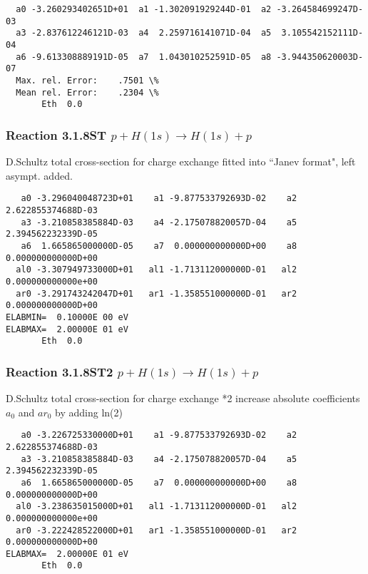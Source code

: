 \documentclass[12pt,dvipdfmx]{article}
\begin{document}
\begin{small}\begin{verbatim}
  a0 -3.260293402651D+01  a1 -1.302091929244D-01  a2 -3.264584699247D-03
  a3 -2.837612246121D-03  a4  2.259716141071D-04  a5  3.105542152111D-04
  a6 -9.613308889191D-05  a7  1.043010252591D-05  a8 -3.944350620003D-07
  Max. rel. Error:    .7501 \%
  Mean rel. Error:    .2304 \%
       Eth  0.0
\end{verbatim}\end{small}

\subsubsection{
Reaction 3.1.8ST $  p + H(1s) \rightarrow H(1s) + p  $
}
D.Schultz total cross-section for charge exchange
fitted into ``Janev format", left asympt. added.


\begin{small}\begin{verbatim}
   a0 -3.296040048723D+01    a1 -9.877533792693D-02    a2  2.622855374688D-03
   a3 -3.210858385884D-03    a4 -2.175078820057D-04    a5  2.394562232339D-05
   a6  1.665865000000D-05    a7  0.000000000000D+00    a8  0.000000000000D+00
  al0 -3.307949733000D+01   al1 -1.713112000000D-01   al2  0.000000000000e+00
  ar0 -3.291743242047D+01   ar1 -1.358551000000D-01   ar2  0.000000000000D+00
ELABMIN=  0.10000E 00 eV
ELABMAX=  2.00000E 01 eV
       Eth  0.0
\end{verbatim}\end{small}

\subsubsection{
Reaction 3.1.8ST2 $  p + H(1s) \rightarrow H(1s) + p  $
}
D.Schultz total cross-section for charge exchange *2
increase absolute coefficients $a_0$ and $ar_0$ by adding ln(2)

\begin{small}\begin{verbatim}
   a0 -3.226725330000D+01    a1 -9.877533792693D-02    a2  2.622855374688D-03
   a3 -3.210858385884D-03    a4 -2.175078820057D-04    a5  2.394562232339D-05
   a6  1.665865000000D-05    a7  0.000000000000D+00    a8  0.000000000000D+00
  al0 -3.238635015000D+01   al1 -1.713112000000D-01   al2  0.000000000000e+00
  ar0 -3.222428522000D+01   ar1 -1.358551000000D-01   ar2  0.000000000000D+00
ELABMAX=  2.00000E 01 eV
       Eth  0.0
\end{verbatim}\end{small}
\end{document}
